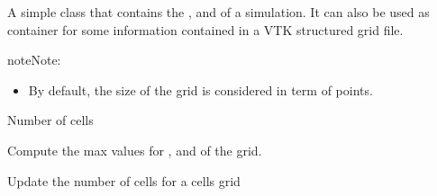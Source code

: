 \documentclass[letterpaper,10pt,english]{sphinxmanual}
\begin{document}
\begin{fulllineitems}
\label{\detokenize{appendices:s2Dcd.grid.Grid}}
A simple class that contains the ,  and  of a
simulation.  It can also be used as container for some information
contained in a VTK structured grid file.

\begin{sphinxadmonition}{note}{Note:}\begin{itemize}
\item {} 
By default, the size of the grid is considered in term of points.

\end{itemize}
\end{sphinxadmonition}







\begin{fulllineitems}
\label{\detokenize{appendices:s2Dcd.grid.Grid.cells}}
Number of cells

\end{fulllineitems}


\begin{fulllineitems}
\label{\detokenize{appendices:s2Dcd.grid.Grid.compute_max}}
Compute the max values for ,  and  of the grid.

\end{fulllineitems}


\begin{fulllineitems}
\label{\detokenize{appendices:s2Dcd.grid.Grid.get_cells}}
Update the number of cells for a cells grid


\end{fulllineitems}
\end{fulllineitems}
\end{document}
